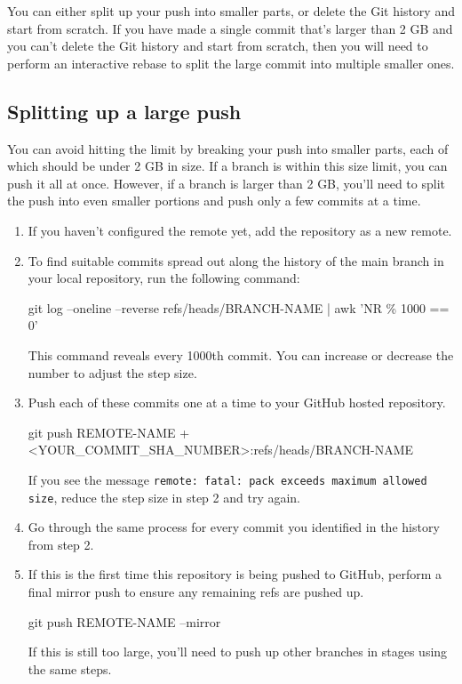 You can either split up your push into smaller parts, or delete the Git history and start from scratch. If you have made a single commit that's larger than 2 GB and you can't delete the Git history and start from scratch, then you will need to perform an interactive rebase to split the large commit into multiple smaller ones.

\subsection{Splitting up a large push}

You can avoid hitting the limit by breaking your push into smaller parts, each of which should be under 2 GB in size. If a branch is within this size limit, you can push it all at once. However, if a branch is larger than 2 GB, you'll need to split the push into even smaller portions and push only a few commits at a time.

\begin{enumerate}
    \item If you haven't configured the remote yet, add the repository as a new remote.
    \item To find suitable commits spread out along the history of the main branch in your local repository, run the following command:
    \begin{codeblock}[language=bash]
git log --oneline --reverse refs/heads/BRANCH-NAME | awk 'NR \% 1000 == 0'
    \end{codeblock}
    This command reveals every 1000th commit. You can increase or decrease the number to adjust the step size.
    \item Push each of these commits one at a time to your GitHub hosted repository.
    \begin{codeblock}[language=bash]
git push REMOTE-NAME +<YOUR\_COMMIT\_SHA\_NUMBER>:refs/heads/BRANCH-NAME
    \end{codeblock}
    If you see the message \texttt{remote: fatal: pack exceeds maximum allowed size}, reduce the step size in step 2 and try again.
    \item Go through the same process for every commit you identified in the history from step 2.
    \item If this is the first time this repository is being pushed to GitHub, perform a final mirror push to ensure any remaining refs are pushed up.
    \begin{codeblock}[language=bash]
git push REMOTE-NAME --mirror
    \end{codeblock}
    If this is still too large, you'll need to push up other branches in stages using the same steps.
\end{enumerate}


